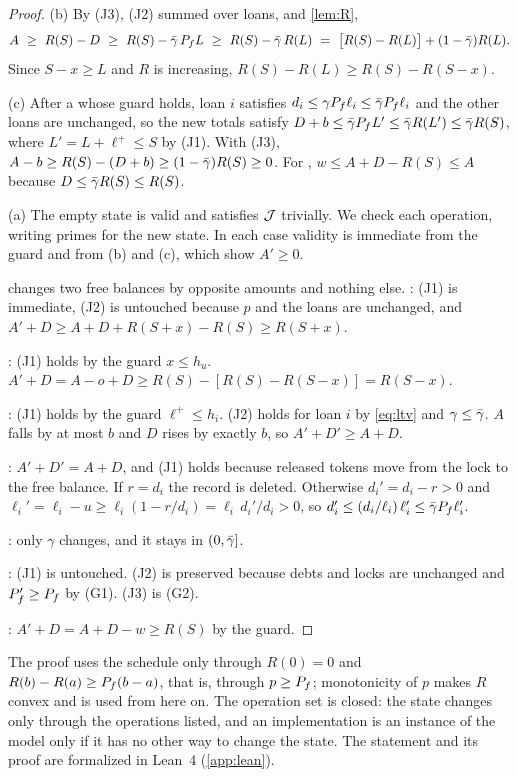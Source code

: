 \begin{proof}
(b) By (J3), (J2) summed over loans, and \cref{lem:R},
\[
A\ \ge\ R(S)-D\ \ge\ R(S)-\gbar\,\Pf L\ \ge\ R(S)-\gbar\,R(L)\ =\ \bigl[R(S)-R(L)\bigr]+(1-\gbar)R(L).
\]
Since $S-x\ge L$ and $R$ is increasing, $R(S)-R(L)\ge R(S)-R(S-x)$.

(c) After a  whose guard holds, loan $i$ satisfies $d_i\le\gamma P_f\ell_i\le\bar\gamma P_f\ell_i$ and the other loans are unchanged, so the new totals satisfy $D+b\le\bar\gamma P_f L'\le\bar\gamma R(L')\le\bar\gamma R(S)$, where $L'=L+\ell^+\le S$ by (J1). With (J3), $A-b\ge R(S)-(D+b)\ge(1-\bar\gamma)R(S)\ge0$. For , $w\le A+D-R(S)\le A$ because $D\le\bar\gamma R(S)\le R(S)$.

(a) The empty state is valid and satisfies $\mathcal{J}$ trivially. We check each operation, writing primes for the new state. In each case validity is immediate from the guard and from (b) and (c), which show $A'\ge0$.

 changes two free balances by opposite amounts and nothing else. : (J1) is immediate, (J2) is untouched because $p$ and the loans are unchanged, and $A'+D\ge A+D+R(S+x)-R(S)\ge R(S+x)$.

: (J1) holds by the guard $x\le h_u$. $A'+D=A-o+D\ge R(S)-[R(S)-R(S-x)]=R(S-x)$.

: (J1) holds by the guard $\ell^+\le h_i$. (J2) holds for loan $i$ by \eqref{eq:ltv} and $\gamma\le\bar\gamma$. $A$ falls by at most $b$ and $D$ rises by exactly $b$, so $A'+D'\ge A+D$.

: $A'+D'=A+D$, and (J1) holds because released tokens move from the lock to the free balance. If $r=d_i$ the record is deleted. Otherwise $d_i'=d_i-r>0$ and $\ell_i'=\ell_i-u\ge \ell_i(1-r/d_i)=\ell_i\,d_i'/d_i>0$, so $d_i'\le (d_i/\ell_i)\,\ell_i'\le\bar\gamma P_f\ell_i'$.

: only $\gamma$ changes, and it stays in $(0,\bar\gamma]$.

: (J1) is untouched. (J2) is preserved because debts and locks are unchanged and $P_f'\ge P_f$ by (G1). (J3) is (G2).

: $A'+D=A+D-w\ge R(S)$ by the guard.
\end{proof}

The proof uses the schedule only through $R(0)=0$ and $R(b)-R(a)\ge P_f(b-a)$, that is, through $p\ge P_f$; monotonicity of $p$ makes $R$ convex and is used from here on. The operation set is closed: the state changes only through the operations listed, and an implementation is an instance of the model only if it has no other way to change the state. The statement and its proof are formalized in Lean~4 (\cref{app:lean}).

